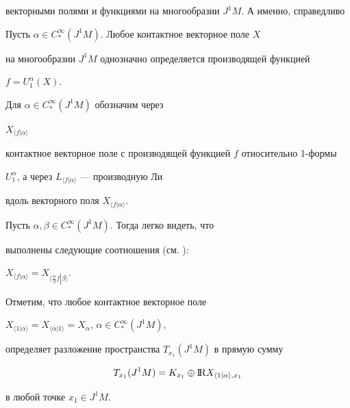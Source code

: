 векторными полями и функциями на многообразии $J^1M$. А именно, справедливо





\begin{prop}


Пусть $\alpha \in C_{*}^\infty (J^1M)$. Любое контактное векторное поле $X$


на многообразии $J^1M$ однозначно определяется производящей функцией


$f=U_1^\alpha (X)$.


\end{prop}





Для $\alpha \in C_{*}^\infty (J^1M)$ обозначим через 


$X_{\langle f|\alpha \rangle} $


контактное векторное поле с производящей функцией $f$ относительно 1-формы


$U_1^\alpha $, а через $L_{\langle f|\alpha \rangle }$ --- производную Ли


вдоль векторного поля $X_{\langle f|\alpha \rangle }$.


Пусть $\alpha ,\beta \in C_{*}^\infty (J^1M).$ Тогда легко видеть, что 


выполнены следующие соотношения (см. \cite{zilbergleit1}): 


$X_{\langle f|\alpha \rangle }=X_{\langle\left.\frac\alpha\beta f\right|


\beta\rangle}$.





Отметим, что любое контактное векторное поле 


$X_{\langle 1|\alpha \rangle }=X_{\langle \alpha |1\rangle


}=X_\alpha$, $\alpha \in C_{*}^\infty (J^1M)$,


определяет разложение пространства $T_{x_1}(J^1M)$ в прямую сумму 


\begin{equation}


T_{x_1}(J^1M)=K_{x_1}\oplus {\BBR}X_{\langle 1|\alpha \rangle ,x_1}


\label{tangentdecomp}


\end{equation}


в любой точке $x_1\in J^1M$.





